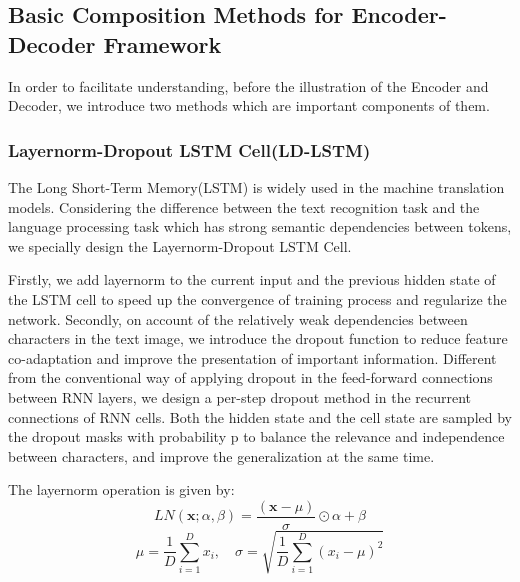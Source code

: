 \documentclass[runningheads]{llncs}
\begin{document}
\subsection{Basic Composition Methods for Encoder-Decoder Framework}
In order to facilitate understanding, before the illustration of the Encoder and Decoder, we introduce two methods which are important components of them. 
\subsubsection{Layernorm-Dropout LSTM Cell(LD-LSTM)}
The Long Short-Term Memory(LSTM) \cite{hochreiter1997long} is widely used in the machine translation models\cite{bahdanau2014neural}. Considering the difference between the text recognition task and the language processing task which has strong semantic dependencies between tokens, we specially design the Layernorm-Dropout LSTM Cell.

Firstly, we add layernorm\cite{ba2016layer} to the current input and the previous hidden state of the LSTM cell to speed up the convergence of training process and regularize the network. Secondly, on account of the relatively weak dependencies between characters in the text image, we introduce the dropout function\cite{hinton2012improving} to reduce feature co-adaptation and improve the presentation of important information. Different from the conventional way of applying dropout in the feed-forward connections between RNN layers\cite{zaremba2014recurrent}, we design a per-step dropout method in the recurrent connections of RNN cells. Both the hidden state and the cell state are sampled by the dropout masks with probability p to balance the relevance and independence between characters, and improve the generalization at the same time. 

The layernorm operation is given by:
\begin{equation}
    LN(\mathbf{x}; \alpha ,\beta )=\frac{(\mathbf{x}-\mu )}{\sigma }\odot \alpha +\beta 
\end{equation}
\begin{equation}
    \mu =\frac{1}{D}\sum_{i=1}^{D}x_{i}, \quad\sigma =\sqrt{\frac{1}{D}\sum_{i=1}^{D}(x_{i}-\mu )^{2}}
\end{equation}
\end{document}
